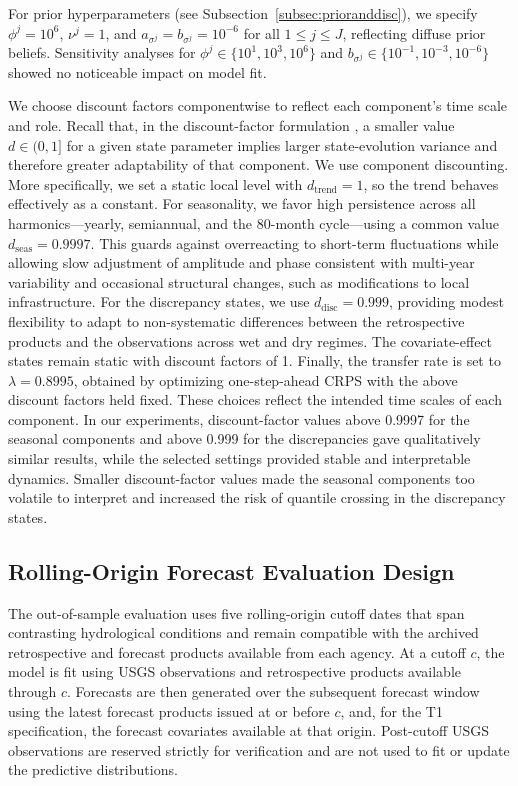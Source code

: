 \documentclass[APA,STIX1COL]{WileyNJD-v2}
\begin{document}
For prior hyperparameters (see Subsection~\ref{subsec:prioranddisc}), we specify \(\phi^j = 10^6\), \(\nu^j = 1\), and \(a_{\sigma^j} = b_{\sigma^j} = 10^{-6}\) for all \(1 \leq j \leq J\), reflecting diffuse prior beliefs. Sensitivity analyses for \(\phi^j \in \{10^1, 10^3, 10^6\}\) and \(b_{\sigma^j} \in \{10^{-1}, 10^{-3}, 10^{-6}\}\) showed no noticeable impact on model fit.

We choose discount factors componentwise to reflect each component’s time scale and role. Recall that, in the discount-factor formulation \citep{prado2021time}, a smaller value \(d \in (0,1]\) for a given state parameter implies larger state-evolution variance and therefore greater adaptability of that component. We use component discounting. More specifically, we set a static local level with \(d_{\text{trend}}=1\), so the trend behaves effectively as a constant. For seasonality, we favor high persistence across all harmonics---yearly, semiannual, and the 80-month cycle---using a common value \(d_{\text{seas}}=0.9997\). This guards against overreacting to short-term fluctuations while allowing slow adjustment of amplitude and phase consistent with multi-year variability and occasional structural changes, such as modifications to local infrastructure. For the discrepancy states, we use \(d_{\text{disc}}=0.999\), providing modest flexibility to adapt to non-systematic differences between the retrospective products and the observations across wet and dry regimes. The covariate-effect states remain static with discount factors of 1. Finally, the transfer rate is set to \(\lambda=0.8995\), obtained by optimizing one-step-ahead CRPS with the above discount factors held fixed. These choices reflect the intended time scales of each component. In our experiments, discount-factor values above 0.9997 for the seasonal components and above 0.999 for the discrepancies gave qualitatively similar results, while the selected settings provided stable and interpretable dynamics. Smaller discount-factor values made the seasonal components too volatile to interpret and increased the risk of quantile crossing in the discrepancy states.

\subsection{Rolling-Origin Forecast Evaluation Design}

The out-of-sample evaluation uses five rolling-origin cutoff dates that span contrasting hydrological conditions and remain compatible with the archived retrospective and forecast products available from each agency. At a cutoff \(c\), the model is fit using USGS observations and retrospective products available through \(c\). Forecasts are then generated over the subsequent forecast window using the latest forecast products issued at or before \(c\), and, for the T1 specification, the forecast covariates available at that origin. Post-cutoff USGS observations are reserved strictly for verification and are not used to fit or update the predictive distributions.
\end{document}
